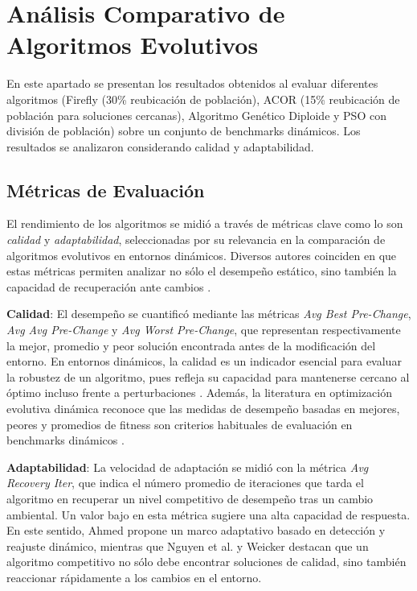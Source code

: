 \documentclass[10pt]{article}
\begin{document}
\section*{Análisis Comparativo de Algoritmos Evolutivos}

En este apartado se presentan los resultados obtenidos al evaluar diferentes algoritmos (Firefly (30\% reubicación de población), ACOR (15\% reubicación de población para soluciones cercanas), Algoritmo Genético Diploide y PSO con división de población) sobre un conjunto de benchmarks dinámicos. Los resultados se analizaron considerando calidad y adaptabilidad.

\subsection*{Métricas de Evaluación}

El rendimiento de los algoritmos se midió a través de métricas clave como lo son \emph{calidad} y \emph{adaptabilidad}, seleccionadas por su relevancia en la comparación de algoritmos evolutivos en entornos dinámicos. Diversos autores coinciden en que estas métricas permiten analizar no sólo el desempeño estático, sino también la capacidad de recuperación ante cambios \cite{morrison2003performance}.

\textbf{Calidad}: El desempeño se cuantificó mediante las métricas \textit{Avg Best Pre-Change}, \textit{Avg Avg Pre-Change} y \textit{Avg Worst Pre-Change}, que representan respectivamente la mejor, promedio y peor solución encontrada antes de la modificación del entorno. En entornos dinámicos, la calidad es un indicador esencial para evaluar la robustez de un algoritmo, pues refleja su capacidad para mantenerse cercano al óptimo incluso frente a perturbaciones \cite{ahmed2024adaptive,morrison2003performance}. Además, la literatura en optimización evolutiva dinámica reconoce que las medidas de desempeño basadas en mejores, peores y promedios de fitness son criterios habituales de evaluación en benchmarks dinámicos \cite{nguyen2012survey,weicker2003performance}.

\textbf{Adaptabilidad}: La velocidad de adaptación se midió con la métrica \textit{Avg Recovery Iter}, que indica el número promedio de iteraciones que tarda el algoritmo en recuperar un nivel competitivo de desempeño tras un cambio ambiental. Un valor bajo en esta métrica sugiere una alta capacidad de respuesta. En este sentido, Ahmed \cite{ahmed2024adaptive} propone un marco adaptativo basado en detección y reajuste dinámico, mientras que Nguyen et al. \cite{nguyen2013kd} y Weicker \cite{weicker2003performance} destacan que un algoritmo competitivo no sólo debe encontrar soluciones de calidad, sino también reaccionar rápidamente a los cambios en el entorno.
\end{document}
